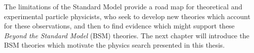 The limitations of the Standard Model provide a road map for theoretical and experimental particle physicists, who seek to develop new theories which account for these observations, and then to find evidence which might support these \textit{Beyond the Standard Model} (BSM) theories. The next chapter will introduce the BSM theories which motivate the physics search presented in this thesis. 
  
